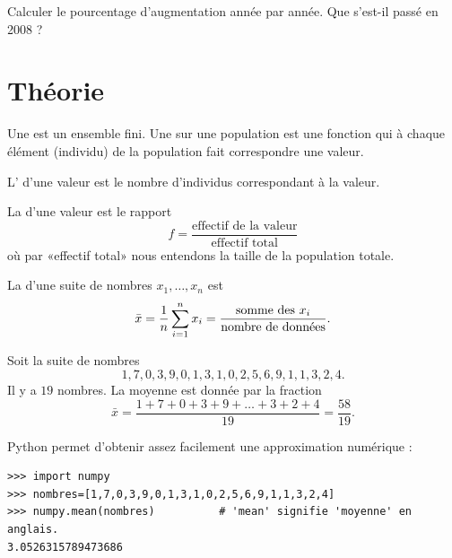 Calculer le pourcentage d'augmentation année par année. Que s'est-il passé en 2008 ?

\section{Théorie}

\begin{definition}
    Une  est un ensemble fini. Une  sur une population est une fonction qui à chaque élément (individu) de la population fait correspondre une valeur.

    L' d'une valeur est le nombre d'individus correspondant à la valeur.

    La  d'une valeur est le rapport
    \begin{equation}
        f=\frac{ \text{effectif de la valeur} }{ \text{effectif total} }
    \end{equation}
    où par «effectif total» nous entendons la taille de la population totale.
\end{definition}

La  d'une suite de nombres \( x_1,\ldots, x_n\) est
\begin{equation}
    \bar x=\frac{1}{ n }\sum_{i=1}^nx_i=\frac{ \text{somme des \( x_i\)} }{\text{nombre de données}}.
\end{equation}

\begin{example}
    Soit la suite de nombres
    \begin{equation}
        1,7,0,3,9,0,1,3,1,0,2,5,6,9,1,1,3,2,4.
    \end{equation}
    Il y a \( 19\) nombres. La moyenne est donnée par la fraction
    \begin{equation}
        \bar x=\frac{ 1+7+0+3+9+\ldots+3+2+4 }{ 19 }=\frac{ 58 }{ 19 }.
    \end{equation}

Python permet d'obtenir assez facilement une approximation numérique :
    \begin{verbatim}
>>> import numpy
>>> nombres=[1,7,0,3,9,0,1,3,1,0,2,5,6,9,1,1,3,2,4]
>>> numpy.mean(nombres)          # 'mean' signifie 'moyenne' en anglais.
3.0526315789473686 
    \end{verbatim}
\end{example}

